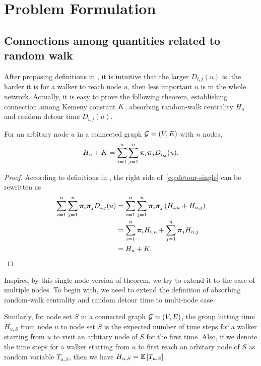 \documentclass[sigconf]{acmart}
\begin{document}
\section{Problem Formulation}\label{sec:prob-form}

\subsection{Connections among quantities related to random walk}

After proposing definitions in , it is intuitive that the larger \(D_{i,j}(u)\) is, the harder it is for a walker to reach node \(u\), then less important \(u\) is in the whole network.
Actually, it is easy to prove the following theorem, establishing connection among Kemeny constant \(K\), absorbing random-walk centrality \(H_u\) and random detour time \(D_{i,j}(u)\).
\begin{theorem}\label{thm:connection-single}
  For an arbitary node \(u\) in a connected graph \(\mathcal{G}=(V,E)\) with \(n\) nodes,
  \begin{equation}\label{eq:detour-single}
    H_u+K=\sum_{i=1}^n\sum_{j=1}^n\boldsymbol{\pi}_i\boldsymbol{\pi}_jD_{i,j}(u).
  \end{equation}
\end{theorem}
\begin{proof}
  According to definitions in , the right side of~\eqref{eq:detour-single} can be rewritten as
  \begin{align*}
    \sum_{i=1}^n\sum_{j=1}^n\boldsymbol{\pi}_i\boldsymbol{\pi}_jD_{i,j}(u) & =\sum_{i=1}^n\sum_{j=1}^n\boldsymbol{\pi}_i\boldsymbol{\pi}_j\left( H_{i,u}+H_{u,j} \right) \\
                                                       & =\sum_{i=1}^n\boldsymbol{\pi}_iH_{i,u}+\sum_{j=1}^n\boldsymbol{\pi}_jH_{u,j}         \\
                                                       & =H_u+K.
  \end{align*}
\end{proof}

Inspired by this single-node version of theorem, we try to extend it to the case of multiple nodes.
To begin with, we need to extend the definition of absorbing random-walk centrality and random detour time to multi-node case.

Similarly, for node set \(S\) in a connected graph \(\mathcal{G}=(V,E)\), the group hitting time \(H_{u,S}\) from node \(u\) to node set \(S\) is the expected number of time steps for a walker starting from \(u\) to visit an arbitary node of \(S\) for the first time.
Also, if we denote the time steps for a walker starting from \(u\) to first reach an arbitary node of \(S\) as random variable \(T_{u,S}\), then we have \(H_{u,S}=\mathbb{E}\left[T_{u,S}\right]\).
\end{document}
